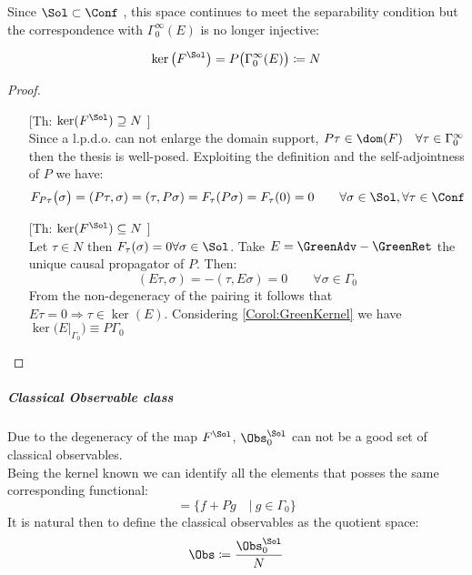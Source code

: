 \documentclass[Main]{subfiles}
\begin{document}
   				Since $\Sol \subset \Conf$ , this space continues to meet the separability condition but the correspondence with  $\Gamma_0^\infty(E)$ is no longer injective:
					\begin{proposition}\label{Teo:NspaceDefinition}
						\begin{displaymath}
							\ker \big( F^\Sol \big) = P \big( \Gamma_0^\infty (E) \big)	\coloneqq N	
						\end{displaymath}
					\end{proposition}
					\begin{proof}
						\begin{itemize}
							\item[[Th: $\ker(F^\Sol) \supseteq N$]]\\
								Since a l.p.d.o. can not enlarge the domain support, $ P \tau \in \dom(F) \quad \forall \tau \in \Gamma_0^\infty$ then the thesis is well-posed.
								Exploiting the definition and the self-adjointness of $P$ we have:
								\begin{displaymath}
									F_{P\tau} \big( \sigma \big) = ( P\tau, \sigma) = (\tau, P\sigma) = F_\tau (P\sigma)= F_\tau(0) = 0 \qquad \forall \sigma \in \Sol, \forall \tau \in \Conf
								\end{displaymath}
							\item[[Th: $\ker(F^\Sol) \subseteq N$]]\\
								Let $	\tau \in N$ then $F_\tau (\sigma) =0 \forall \sigma \in \Sol$.
								Take $E= \GreenAdv- \GreenRet$	 the unique causal propagator of $P$.
								Then:
								\begin{displaymath}
									(E \tau , \sigma) = - (\tau , E \sigma) = 0 \qquad \forall \sigma \in \Gamma_0
								\end{displaymath}								
								From the non-degeneracy of the pairing it follows that $E\tau = 0 \Rightarrow  \tau \in \ker(E)$.
								Considering \ref{Corol:GreenKernel} we have $ \ker \big(E\big\vert_{\Gamma_0} \big) \equiv P \Gamma_0$
						\end{itemize}
					\end{proof}
   			
   			\subparagraph{Classical Observable class}
   					Due to the degeneracy of the map $F^\Sol$, %
   					$\Obs_0^\Sol$ can not be a good set of classical observables.\\
   					Being the kernel known we can identify all the elements that posses the same corresponding functional:
   					\begin{displaymath}
   						[f] = \big\{f + P g \quad\vert\: g \in \Gamma_0\big\}
   					\end{displaymath}
   					It is natural then to define the classical observables as the quotient space:
   									\begin{displaymath}
   										\Obs \coloneqq \frac{\Obs_0^\Sol}{N}
   									\end{displaymath}
   									
\end{document}
